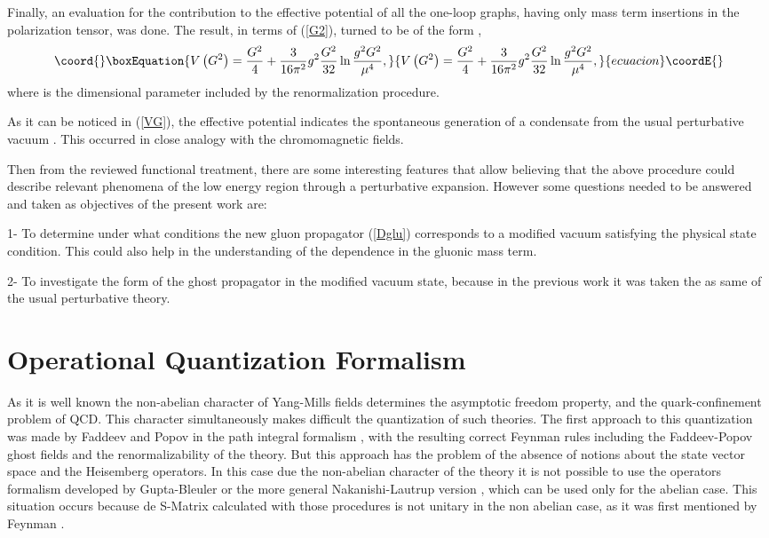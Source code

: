 \documentclass[12pt,letterpaper]{report}
\begin{document}
Finally, an evaluation for the contribution to the effective
potential of all the one-loop graphs, having only mass term
insertions in the polarization tensor, was done. The result, in
terms of \coordHE{} (\ref{G2}), turned to be of the form \cite{Cabo},
\begin{equation}\coord{}\boxEquation{
V\left(G^2\right) =\frac{G^2}4+\frac 3{16\pi
^2}g^2\frac{G^2}{32}\ln \frac{ g^2G^2}{\mu ^4}, \label{VG}
}{
V\left(G^2\right) =\frac{G^2}4+\frac 3{16\pi
^2}g^2\frac{G^2}{32}\ln \frac{ g^2G^2}{\mu ^4}, }{ecuacion}\coordE{}\end{equation}
where \myHighlight{$\mu $}\coordHE{} is the dimensional parameter included by the
renormalization procedure.

As it can be noticed in (\ref{VG}), the effective potential
indicates the spontaneous generation of a \coordHE{} condensate from
the usual perturbative vacuum \coordHE{}. This occurred
in close analogy with the chromomagnetic fields.

Then from the reviewed functional treatment, there are some
interesting features that allow believing that the above procedure
could describe relevant phenomena of the low energy region through
a perturbative expansion. However some questions needed to be
answered and taken as objectives of the present work are:

1- To determine under what conditions the new gluon propagator
(\ref{Dglu}) corresponds to a modified vacuum satisfying the
physical state condition. This could also help in the
understanding of the \myHighlight{$\alpha$}\coordHE{} dependence in the gluonic mass term.

2- To investigate the form of the ghost propagator in the modified
vacuum state, because in the previous work \cite{Cabo} it was
taken the as same of the usual perturbative theory.

\section{Operational Quantization Formalism}

As it is well known the non-abelian character of Yang-Mills fields
determines the asymptotic freedom property, and the
quark-confinement problem of QCD. This character simultaneously
makes difficult the quantization of such theories. The first
approach to this quantization was made by Faddeev and Popov in the
path integral formalism \cite{Faddeev-Popov}, with the resulting
correct Feynman rules including the Faddeev-Popov ghost fields and
the renormalizability of the theory. But this approach has the
problem of the absence of notions about the state vector space and
the Heisemberg operators. In this case due the non-abelian
character of the theory it is not possible to use the operators
formalism developed by Gupta-Bleuler \cite{Gupta} or the more
general Nakanishi-Lautrup version \cite{Nakanishi}, which can be
used only for the abelian case. This situation occurs because de
S-Matrix calculated with those procedures is not unitary in the
non abelian case, as it was first mentioned by Feynman
\cite{Feynman}.
\end{document}

